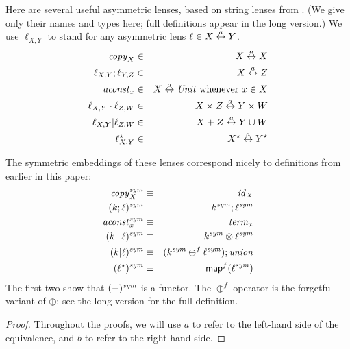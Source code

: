 \begin{defn}[$R$-similarity]
\begin{theorem}
\begin{lemma}
\begin{theorem}[No products]
\begin{lemma}
\begin{defn}
\begin{theorem}
\begin{theorem}
\begin{corollary}[Hylomorphism]
\begin{defn}
\begin{defn}
\begin{defn}[Symmetrization]
\begin{definition}
\else
Here are several useful asymmetric lenses, based on string lenses from
\cite{Boomerang07}. 
(We give only their names and types here; 
full definitions appear in the long version.) We use
$\ell_{X,Y}$ to stand for any asymmetric lens $\ell \in X \overset{a}{\leftrightarrow} Y$.
\begin{eqnarray*}
    \mathit{copy}_X &\in& X \overset{a}{\leftrightarrow} X \\
    \ell_{X,Y};\ell_{Y,Z} &\in& X \overset{a}{\leftrightarrow} Z \\
    \mathit{aconst}_x &\in& X \overset{a}{\leftrightarrow} \mathit{Unit} \mbox{ whenever } x \in X \\
    \ell_{X,Y}\cdot\ell_{Z,W} &\in& X \times Z \overset{a}{\leftrightarrow} Y \times W \\
    \ell_{X,Y}|\ell_{Z,W} &\in& X + Z \overset{a}{\leftrightarrow} Y \cup W \\
    \ell_{X,Y}^\star &\in& X^\star \overset{a}{\leftrightarrow} Y^\star
\end{eqnarray*}
\fi %
\end{definition}

\begin{theorem} The symmetric embeddings of these lenses correspond nicely
    to definitions from earlier in this paper:
\setcounter{equation}{0}
\begin{eqnarray}
    \mathit{copy}_X^\mathit{sym}        &\equiv& \mathit{id}_X \\
    (k;\ell)^\mathit{sym}        &\equiv& k^\mathit{sym};\ell^\mathit{sym} \\
    \mathit{aconst}_x^\mathit{sym}       &\equiv& \mathit{term}_x \\
    (k\cdot\ell)^\mathit{sym}    &\equiv& k^\mathit{sym}\otimes\ell^\mathit{sym} \\
    (k|\ell)^\mathit{sym}        &\equiv& (k^\mathit{sym} \oplus^f \ell^\mathit{sym});\mathit{union} \\
    (\ell^\star)^\mathit{sym}     &\equiv& \mathsf{map}^f(\ell^\mathit{sym})
\end{eqnarray}
The first two show that $(-)^\mathit{sym}$ is a functor. \iffull\else The $\oplus^f$ operator is
the forgetful variant of $\oplus$; see the long version for the full
definition.\fi
\end{theorem}

\iffull
\begin{proof} Throughout the proofs, we will use $a$ to refer to the
left-hand side of the equivalence, and $b$ to refer to the right-hand side.


\end{proof}
\end{defn}
\end{defn}
\end{defn}
\end{corollary}
\end{theorem}
\end{theorem}
\end{defn}
\end{lemma}
\end{theorem}
\end{lemma}
\end{theorem}
\end{defn}
